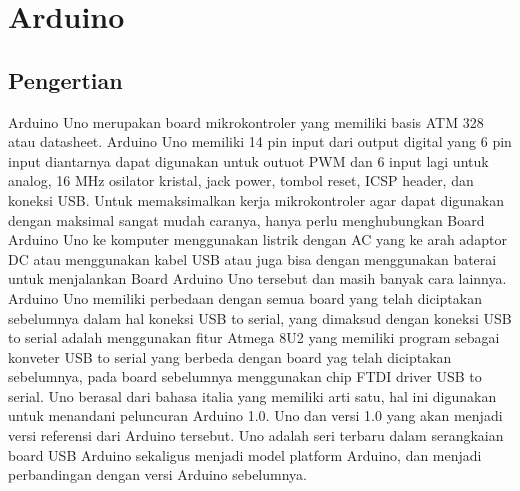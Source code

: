 \section{Arduino}
\subsection{Pengertian}
Arduino Uno merupakan board mikrokontroler yang memiliki basis ATM 328 atau datasheet. Arduino Uno memiliki 14 pin input dari output digital yang 6 pin input diantarnya dapat digunakan untuk outuot PWM dan 6 input lagi untuk analog, 16 MHz osilator kristal, jack power, tombol reset, ICSP header, dan koneksi USB. Untuk memaksimalkan kerja mikrokontroler agar dapat digunakan dengan maksimal sangat mudah caranya, hanya perlu menghubungkan Board Arduino Uno ke komputer menggunakan listrik dengan  AC yang ke arah  adaptor DC atau menggunakan kabel USB atau  juga bisa dengan menggunakan baterai untuk menjalankan Board Arduino Uno tersebut dan masih banyak cara lainnya.
Arduino Uno memiliki perbedaan dengan semua board yang telah diciptakan sebelumnya dalam hal koneksi USB to serial, yang dimaksud dengan koneksi USB to serial adalah menggunakan fitur Atmega 8U2 yang memiliki program sebagai konveter USB to serial yang berbeda dengan board yag telah diciptakan sebelumnya, pada board sebelumnya menggunakan chip FTDI driver USB to serial.
Uno berasal dari bahasa italia yang memiliki arti satu, hal ini digunakan untuk menandani peluncuran Arduino 1.0. Uno dan versi 1.0 yang akan menjadi versi referensi dari Arduino tersebut. Uno adalah seri terbaru dalam serangkaian board USB Arduino sekaligus menjadi model platform Arduino, dan menjadi perbandingan dengan versi Arduino sebelumnya.
